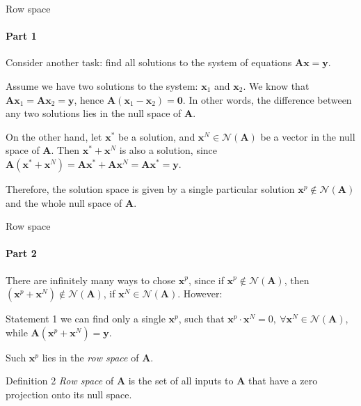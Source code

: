 \documentclass{beamer}
\begin{document}
\begin{frame}{Row space}
\framesubtitle{Part 1}
\begin{flushleft}

Consider another task: find all solutions to the system of equations $\mathbf{A} \mathbf{x} = \mathbf{y}$.

\bigskip

Assume we have two solutions to the system: $\mathbf{x}_1$ and $\mathbf{x}_2$. We know that $\mathbf{A} \mathbf{x}_1 = \mathbf{A} \mathbf{x}_2= \mathbf{y}$, hence $\mathbf{A} (\mathbf{x}_1 - \mathbf{x}_2) = \mathbf{0}$. In other words, the difference between any two solutions lies in the null space of $\mathbf{A}$.

\bigskip

On the other hand, let $\mathbf{x}^*$ be a solution, and $\mathbf{x}^N \in \mathcal{N}(\mathbf{A})$ be a vector in the null space of $\mathbf{A}$. Then $\mathbf{x}^* + \mathbf{x}^N$ is also a solution, since $\mathbf{A} (\mathbf{x}^* + \mathbf{x}^N) = \mathbf{A} \mathbf{x}^* + \mathbf{A} \mathbf{x}^N = \mathbf{A} \mathbf{x}^* = \mathbf{y}$.

\bigskip

Therefore, the solution space is given by a single particular solution $\mathbf{x}^p \notin \mathcal{N}(\mathbf{A})$ and the whole null space of $\mathbf{A}$.

\end{flushleft}
\end{frame}


\begin{frame}{Row space}
\framesubtitle{Part 2}
\begin{flushleft}

There are infinitely many ways to chose $\mathbf{x}^p$, since if $\mathbf{x}^p \notin \mathcal{N}(\mathbf{A})$, then $(\mathbf{x}^p + \mathbf{x}^N) \notin \mathcal{N}(\mathbf{A})$, if $\mathbf{x}^N \in \mathcal{N}(\mathbf{A})$. However: 

\begin{block}{Statement 1}
we can find only a single $\mathbf{x}^p$, such that $\mathbf{x}^p \cdot \mathbf{x}^N = 0, \ \forall \mathbf{x}^N \in \mathcal{N}(\mathbf{A})$, while $\mathbf{A} (\mathbf{x}^p + \mathbf{x}^N) = \mathbf{y}$.
\end{block}

\bigskip

Such $\mathbf{x}^p$ lies in the \emph{row space} of $\mathbf{A}$. 

\begin{block}{Definition 2}
\emph{Row space} of $\mathbf{A}$ is the set of all inputs to $\mathbf{A}$ that have a zero projection onto its null space.
\end{block}

\end{flushleft}
\end{frame}
\end{document}

